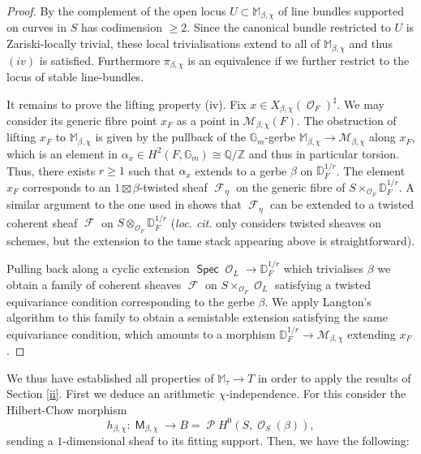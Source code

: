 \documentclass{article}
\DeclareMathOperator{\Oc}{\mathcal{O}}
\DeclareMathOperator{\CO}{\mathcal{O}}
\DeclareMathOperator{\F}{\mathcal{F}}
\DeclareMathOperator{\M}{{\mathsf{M}}}
\newcommand{\Mc}{\mathcal{M}}
\DeclareMathOperator{\Pc}{\mathcal{P}}
\DeclareMathOperator{\Spec}{\mathsf{Spec}}
\newcommand{\BG}{{\mathbb{G}}}
\newcommand{\BM}{{\mathbb{M}}}
\newcommand{\BP}{{\Pc}}
\newcommand{\BQ}{{\mathbb{Q}}}
\newcommand{\BZ}{{\mathbb{Z}}}
\newcommand{\CM}{{\mathcal M}}
\newcommand{\Dr}[1][r]{\mathbb{D}_F^{1/#1}}
\theoremstyle{definition}
\theoremstyle{plain}
\begin{document}
\begin{proof}


By \cite[Proposition 2.2.1]{COW21} the complement of the open locus $U\subset \BM_{\beta,\chi}$ of line bundles supported on curves in $S$ has codimension $\geq 2$. Since the canonical bundle restricted to $U$ is Zariski-locally trivial, these local trivialisations extend to all of $\BM_{\beta,\chi}$ and thus $(iv)$ is satisfied. Furthermore $\pi_{\beta,\chi}$ is an equivalence if we further restrict to the locus of stable line-bundles. 


It remains to prove the lifting property (iv). Fix $x \in X_{\beta,\chi}(\Oc_F)^\sharp$. We may consider its generic fibre point $x_F$ as a point in $\CM_{\beta,\chi}(F)$. The obstruction of lifting $x_F$ to $\BM_{\beta,\chi}$ is given by the pullback of the $\BG_m$-gerbe $\BM_{\beta,\chi} \to \CM_{\beta,\chi}$ along $x_F$, which is an element in $\alpha_x \in H^2(F,\BG_m) \cong \BQ/\BZ$ and thus in particular torsion. Thus, there exists $r \geq 1$ such that $\alpha_x$ extends to a gerbe $\beta$ on $\Dr$. The element $x_F$ corresponds to an $1 \boxtimes \beta$-twisted sheaf $\F_{\eta}$ on the generic fibre of $S \times_{\Oc_F} \Dr$. A similar argument to the one used in \cite[Lemma 3.1.3.1]{Lieblich_2008} shows that $\F_{\eta}$ can be extended to a twisted coherent sheaf $\F$ on $S \otimes_{\Oc_F} \Dr$ (\emph{loc. cit.} only considers twisted sheaves on schemes, but the extension to the tame stack appearing above is straightforward). 

Pulling back along a cyclic extension $\Spec \Oc_L \to \Dr$ which trivialises $\beta$ we obtain a family of coherent sheaves $\F$ on $S \times_{\Oc_F} \Oc_L$ satisfying a twisted equivariance condition corresponding to the gerbe $\beta$. We apply Langton's algorithm to this family to obtain a semistable extension satisfying the same equivariance condition, which amounts to a morphism $\Dr \to \Mc_{\beta,\chi}$ extending $x_F$.
\end{proof}

We thus have established all properties of $\BM_{\tau}\to T$ in order to apply the results of Section \ref{ii}. First we deduce an arithmetic $\chi$-independence. For this consider the Hilbert-Chow morphism 
\[h_{\beta,\chi}: \M_{\beta,\chi} \to B=\BP H^0(S,\CO_S(\beta)),\] 
sending a $1$-dimensional sheaf to its fitting support. Then, we have the following: 
\end{document}
